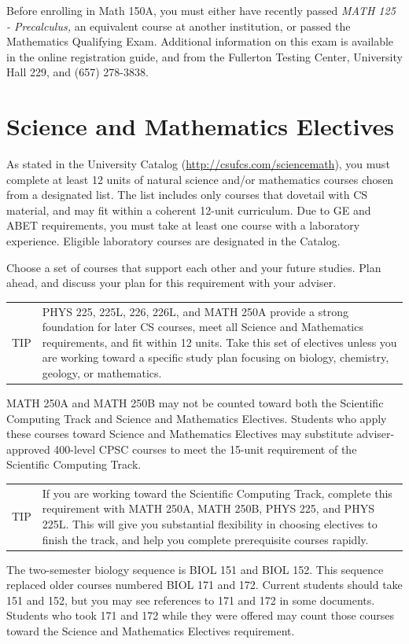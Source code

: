 \documentclass{book}
\newenvironment{tip}{
  \tcolorbox \begin{tabular}{m{.5in} m{5.25in}}
    \Large{TIP} &
}{
  \end{tabular} \endtcolorbox
}
\newcommand{\shrunkurl}[1]{\url{http://csufcs.com/#1}}
\begin{document}
Before enrolling in Math 150A, you must either have recently passed \emph{MATH 125 - Precalculus,} an equivalent course at another institution, or passed the Mathematics Qualifying Exam. Additional information on this exam is available in the online registration guide, and from the Fullerton Testing Center, University Hall 229, and (657) 278-3838.

\section{Science and Mathematics Electives}

As stated in the University Catalog (\shrunkurl{sciencemath}), you must complete at least 12 units of natural science and/or mathematics courses chosen from a designated list. The list includes only courses that dovetail with CS material, and may fit within a coherent 12-unit curriculum. Due to GE and ABET requirements, you must take at least one course with a laboratory experience. Eligible laboratory courses are designated in the Catalog.

Choose a set of courses that support each other and your future studies. Plan ahead, and discuss your plan for this requirement with your adviser.

\begin{tip}
PHYS 225, 225L, 226, 226L, and MATH 250A provide a strong foundation for later CS courses, meet all Science and Mathematics requirements, and fit within 12 units. Take this set of electives unless you are working toward a specific study plan focusing on biology, chemistry, geology, or mathematics.
\end{tip}

MATH 250A and MATH 250B may not be counted toward both the Scientific Computing Track \ScTrackIndex and Science and Mathematics Electives. Students who apply these courses toward Science and Mathematics Electives may substitute adviser-approved 400-level CPSC courses to meet the 15-unit requirement of the Scientific Computing Track.

\begin{tip}
If you are working toward the Scientific Computing Track, complete this requirement with  MATH 250A, MATH 250B, PHYS 225, and PHYS 225L. This will give you substantial flexibility in choosing electives to finish the track, and help you complete prerequisite courses rapidly.
\end{tip}

The two-semester biology sequence is BIOL 151 and BIOL 152. This sequence replaced older courses numbered BIOL 171 and 172. Current students should take 151 and 152, but you may see references to 171 and 172 in some documents. Students who took 171 and 172 while they were offered may count those courses toward the Science and Mathematics Electives requirement.
\end{document}
